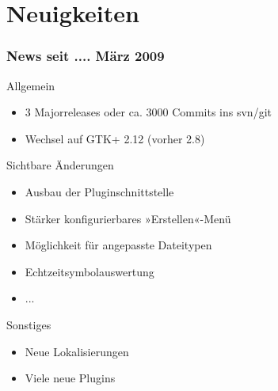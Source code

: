 \section{Neuigkeiten}
\begin{frame}
	\frametitle{News seit .... März 2009}
	\begin{block}{Allgemein}
		\begin{itemize}
			\item 3 Majorreleases oder ca. 3000 Commits ins svn/git
			\item Wechsel auf GTK+ 2.12 (vorher 2.8)
		\end{itemize}
	\end{block}
	\begin{block}{Sichtbare Änderungen}
		\begin{itemize}
			\item Ausbau der Pluginschnittstelle
			\item Stärker konfigurierbares »Erstellen«-Menü
			\item Möglichkeit für angepasste Dateitypen
			\item Echtzeitsymbolauswertung
			\item ...
		\end{itemize}
	\end{block}
	\begin{block}{Sonstiges}
		\begin{itemize}
			\item Neue Lokalisierungen
			\item Viele neue Plugins
		\end{itemize}
	\end{block}
\end{frame}
